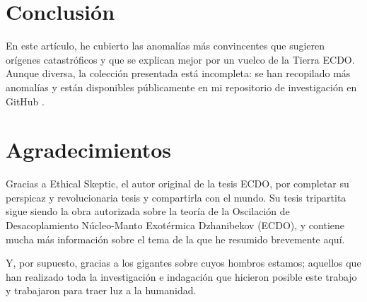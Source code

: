 \documentclass[10pt,twocolumn,letterpaper]{article}
\begin{document}
\section{Conclusión}

En este artículo, he cubierto las anomalías más convincentes que sugieren orígenes catastróficos y que se explican mejor por un vuelco de la Tierra ECDO. Aunque diversa, la colección presentada está incompleta: se han recopilado más anomalías y están disponibles públicamente en mi repositorio de investigación en GitHub \cite{2}.

\section{Agradecimientos}

Gracias a Ethical Skeptic, el autor original de la tesis ECDO, por completar su perspicaz y revolucionaria tesis y compartirla con el mundo. Su tesis tripartita \cite{1} sigue siendo la obra autorizada sobre la teoría de la Oscilación de Desacoplamiento Núcleo-Manto Exotérmica Dzhanibekov (ECDO), y contiene mucha más información sobre el tema de la que he resumido brevemente aquí.

Y, por supuesto, gracias a los gigantes sobre cuyos hombros estamos; aquellos que han realizado toda la investigación e indagación que hicieron posible este trabajo y trabajaron para traer luz a la humanidad.

\clearpage
\twocolumn

{\small
\renewcommand{\refname}{Referencias}


}
\end{document}
